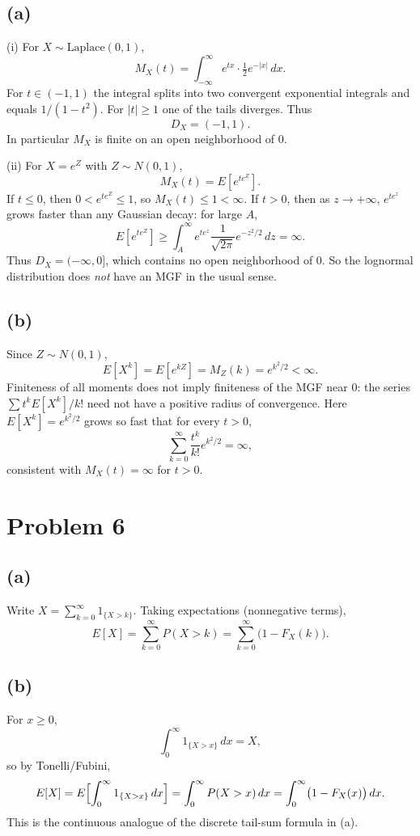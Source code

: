\documentclass[11pt]{article}
\begin{document}
\subsection*{(a)}

(i) For $X\sim\mathrm{Laplace}(0,1)$,
\[
M_X(t)=\int_{-\infty}^{\infty} e^{tx}\cdot\tfrac12 e^{-|x|}\,dx.
\]
For $t\in(-1,1)$ the integral splits into two convergent exponential integrals and equals $1/(1-t^2)$. For $|t|\ge 1$ one of the tails diverges. Thus
\[
D_X=(-1,1).
\]
In particular $M_X$ is finite on an open neighborhood of $0$.

(ii) For $X=e^Z$ with $Z\sim N(0,1)$,
\[
M_X(t)=E[e^{t e^Z}].
\]
If $t\le 0$, then $0<e^{t e^Z}\le 1$, so $M_X(t)\le 1<\infty$. If $t>0$, then as $z\to+\infty$, $e^{t e^z}$ grows faster than any Gaussian decay: for large $A$,
\[
E[e^{t e^Z}]\ge\int_A^\infty e^{t e^z}\frac{1}{\sqrt{2\pi}}e^{-z^2/2}\,dz=\infty.
\]
Thus $D_X=(-\infty,0]$, which contains no open neighborhood of $0$. So the lognormal distribution does \emph{not} have an MGF in the usual sense.

\subsection*{(b)}

Since $Z\sim N(0,1)$,
\[
E[X^k]=E[e^{kZ}]=M_Z(k)=e^{k^2/2}<\infty.
\]
Finiteness of all moments does not imply finiteness of the MGF near $0$: the series $\sum t^k E[X^k]/k!$ need not have a positive radius of convergence. Here $E[X^k]=e^{k^2/2}$ grows so fast that for every $t>0$,
\[
\sum_{k=0}^\infty\frac{t^k}{k!}e^{k^2/2}=\infty,
\]
consistent with $M_X(t)=\infty$ for $t>0$.

\section*{Problem 6}

\subsection*{(a)}

Write $X=\sum_{k=0}^\infty 1_{\{X>k\}}$. Taking expectations (nonnegative terms),
\[
E[X]=\sum_{k=0}^\infty P(X>k)=\sum_{k=0}^\infty\bigl(1-F_X(k)\bigr).
\]

\subsection*{(b)}

For $x\ge 0$,
\[
\int_0^\infty 1_{\{X>x\}}\,dx = X,
\]
so by Tonelli/Fubini,
\[
E[X]=E\Bigl[\int_0^\infty 1_{\{X>x\}}\,dx\Bigr]=\int_0^\infty P(X>x)\,dx=\int_0^\infty\bigl(1-F_X(x)\bigr)\,dx.
\]
This is the continuous analogue of the discrete tail-sum formula in (a).
\end{document}
